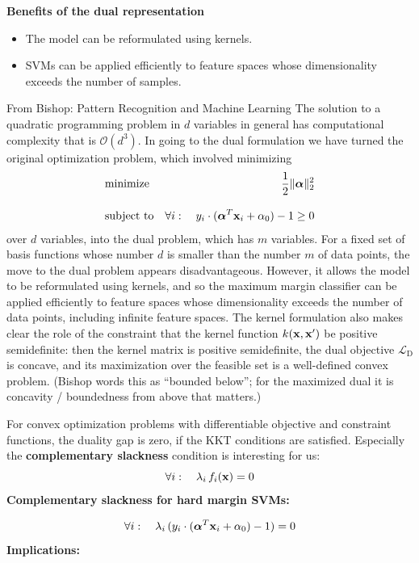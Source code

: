   \textbf{Benefits of the dual representation}
  \begin{itemize}
    \item The model can be reformulated using kernels.
    \item SVMs can be applied efficiently to feature spaces whose dimensionality exceeds the number of samples.
  \end{itemize}

  From Bishop: Pattern Recognition and Machine Learning
  The solution to a quadratic programming problem in $d$ variables in general has computational complexity that is $\mathcal{O}(d^3)$.
  In going to the dual formulation we have turned the original optimization problem, which involved minimizing
  \begin{eqnarray*}
    & \mbox{minimize}   & \frac{1}{2} {\|\bm{\mathrm{\alpha}}\|^2_2} \\[.3cm]
    & \mbox{subject to} & \forall i: \quad y_i\cdot (\bm{\mathrm{\alpha}}^T\bm{\mathrm{x}}_i + \alpha_0) -1 \geq 0
  \end{eqnarray*}
  over $d$ variables, into the dual problem, which has $m$ variables.
  For a fixed set of basis functions whose number $d$ is smaller than the number $m$ of data points, the move to the dual problem appears disadvantageous. 
  However, it allows the model to be reformulated using kernels, and so the maximum margin classifier can be applied efficiently to feature spaces whose dimensionality exceeds the number of data points, including infinite feature spaces.
  The kernel formulation also makes clear the role of the constraint that the kernel function $k(\bm{\mathrm{x}},\bm{\mathrm{x}}')$ be positive semidefinite: then the kernel matrix is positive semidefinite, the dual objective $\mathcal L_\text{D}$ is concave, and its maximization over the feasible set is a well-defined convex problem. (Bishop words this as ``bounded below''; for the maximized dual it is concavity / boundedness from above that matters.)

  For convex optimization problems with differentiable objective and constraint functions, the duality gap is zero, if the KKT conditions are satisfied. Especially the \textbf{complementary slackness} condition is interesting for us:
  \begin{displaymath}
    \forall i: \quad \lambda_i \, f_i(\bm{\mathrm{x}}) = 0 
  \end{displaymath}
  \textbf{Complementary slackness for hard margin SVMs:}

  \begin{displaymath}
    \forall i: \quad \lambda_i \, (y_i\cdot (\bm{\mathrm{\alpha}}^T\bm{\mathrm{x}}_i + \alpha_0) - 1) = 0  
  \end{displaymath}
  \textbf{Implications:} 
  
